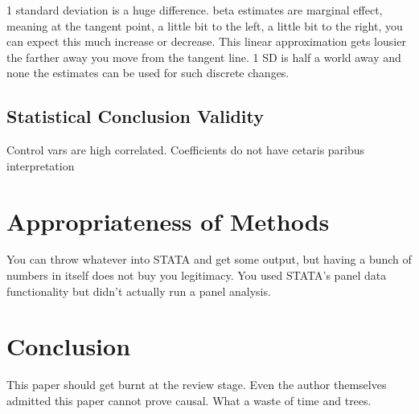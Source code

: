 1 standard deviation is a huge difference. beta estimates are marginal effect, meaning at the tangent point, a little bit to the left, a little bit to the right, you can expect this much increase or decrease. This linear approximation gets lousier the farther away you move from the tangent line. 1 SD is half a world away and none the estimates can be used for such discrete changes.

\subsection{Statistical Conclusion Validity}

Control vars are high correlated. Coefficients do not have cetaris paribus interpretation

\section{Appropriateness of Methods}

You can throw whatever into STATA and get some output, but having a bunch of numbers in itself does not buy you legitimacy. You used STATA's panel data functionality but didn't actually run a panel analysis.

\section{Conclusion}

This paper should get burnt at the review stage. Even the author themselves admitted this paper cannot prove causal. What a waste of time and trees.
